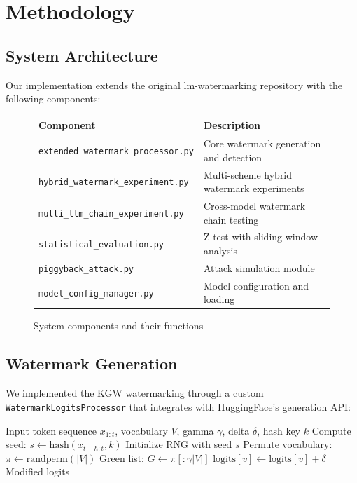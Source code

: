\documentclass[12pt,letterpaper]{article}
\begin{document}
\section{Methodology}

\subsection{System Architecture}

Our implementation extends the original lm-watermarking repository with the following components:

\begin{figure}[H]
\centering
\begin{tabular}{|l|p{8cm}|}
\hline
\textbf{Component} & \textbf{Description} \\
\hline
\texttt{extended\_watermark\_processor.py} & Core watermark generation and detection \\
\texttt{hybrid\_watermark\_experiment.py} & Multi-scheme hybrid watermark experiments \\
\texttt{multi\_llm\_chain\_experiment.py} & Cross-model watermark chain testing \\
\texttt{statistical\_evaluation.py} & Z-test with sliding window analysis \\
\texttt{piggyback\_attack.py} & Attack simulation module \\
\texttt{model\_config\_manager.py} & Model configuration and loading \\
\hline
\end{tabular}
\caption{System components and their functions}
\end{figure}

\subsection{Watermark Generation}

We implemented the KGW watermarking through a custom \texttt{WatermarkLogitsProcessor} that integrates with HuggingFace's generation API:

\begin{algorithm}[H]
\caption{Watermark Logits Processing}
\begin{algorithmic}[1]
\REQUIRE Input token sequence $x_{1:t}$, vocabulary $V$, gamma $\gamma$, delta $\delta$, hash key $k$
\STATE Compute seed: $s \leftarrow \text{hash}(x_{t-h:t}, k)$ 
\STATE Initialize RNG with seed $s$
\STATE Permute vocabulary: $\pi \leftarrow \text{randperm}(|V|)$
\STATE Green list: $G \leftarrow \pi[:\gamma|V|]$
        \STATE $\text{logits}[v] \leftarrow \text{logits}[v] + \delta$
    \ENDIF
\ENDFOR
\RETURN Modified logits
\end{algorithmic}
\end{algorithm}
\end{document}
